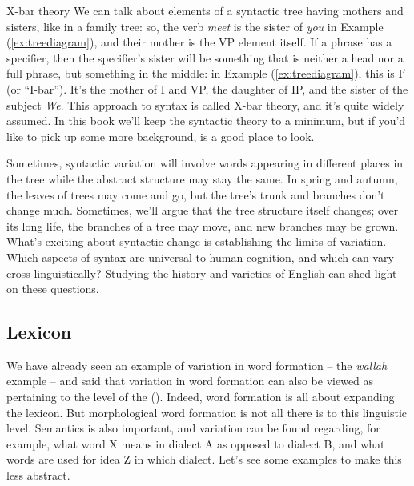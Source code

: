 \begin{syntaxbox}{X-bar theory}
We can talk about elements of a syntactic tree having mothers and sisters, like in a family tree: so, the verb \emph{meet} is the sister of \emph{you} in Example (\ref{ex:treediagram}), and their mother is the VP element itself. If a phrase has a specifier, then the specifier's sister will be something that is neither a head nor a full phrase, but something in the middle: in Example (\ref{ex:treediagram}), this is I$'$ (or ``I-bar''). It's the mother of I and VP, the daughter of IP, and the sister of the subject \emph{We}. This approach to syntax is called X-bar theory, and it's quite widely assumed. In this book we'll keep the syntactic theory to a minimum, but if you'd like to pick up some more background, \citet{Carnie2013} is a good place to look.
\end{syntaxbox}

\noindent Sometimes, syntactic variation will involve words appearing in different places in the tree while the abstract structure may stay the same. In spring and autumn, the leaves of trees may come and go, but the tree's trunk and branches don't change much. Sometimes, we'll argue that the tree structure itself changes; over its long life, the branches of a tree may move, and new branches may be grown. What's exciting about syntactic change is establishing the limits of variation. Which aspects of syntax are universal to human cognition, and which can vary cross-linguistically? Studying the history and varieties of English can shed light on these questions.

\subsection{Lexicon}\label{lexicon}
We have already seen an example of variation in word formation -- the \emph{wallah} example -- and said that variation in word formation can also be viewed as pertaining to the level of the  (). Indeed, word formation is all about expanding the lexicon. But morphological word formation is not all there is to this linguistic level. Semantics is also important, and variation can be found regarding, for example, what word X means in dialect A as opposed to dialect B, and what words are used for idea Z in which dialect. Let's see some examples to make this less abstract.

